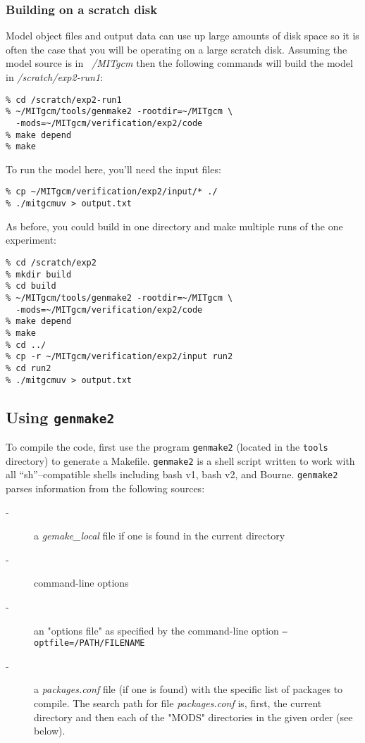 \subsubsection{Building on a scratch disk}

Model object files and output data can use up large amounts of disk
space so it is often the case that you will be operating on a large
scratch disk. Assuming the model source is in {\em ~/MITgcm} then the
following commands will build the model in {\em /scratch/exp2-run1}:
\begin{verbatim}
% cd /scratch/exp2-run1
% ~/MITgcm/tools/genmake2 -rootdir=~/MITgcm \
  -mods=~/MITgcm/verification/exp2/code
% make depend
% make
\end{verbatim}
To run the model here, you'll need the input files:
\begin{verbatim}
% cp ~/MITgcm/verification/exp2/input/* ./
% ./mitgcmuv > output.txt
\end{verbatim}

As before, you could build in one directory and make multiple runs of
the one experiment:
\begin{verbatim}
% cd /scratch/exp2
% mkdir build
% cd build
% ~/MITgcm/tools/genmake2 -rootdir=~/MITgcm \
  -mods=~/MITgcm/verification/exp2/code
% make depend
% make
% cd ../
% cp -r ~/MITgcm/verification/exp2/input run2
% cd run2
% ./mitgcmuv > output.txt
\end{verbatim}


\subsection{Using \texttt{genmake2}}
\label{sect:genmake}

To compile the code, first use the program \texttt{genmake2} (located
in the \texttt{tools} directory) to generate a Makefile.
\texttt{genmake2} is a shell script written to work with all
``sh''--compatible shells including bash v1, bash v2, and Bourne.
\texttt{genmake2} parses information from the following sources:
\begin{description}
\item[-] a {\em gemake\_local} file if one is found in the current 
  directory
\item[-] command-line options
\item[-] an "options file" as specified by the command-line option
  \texttt{--optfile=/PATH/FILENAME}
\item[-] a {\em packages.conf} file (if one is found) with the 
  specific list of packages to compile. The search path for 
  file {\em packages.conf} is, first, the current directory and
  then each of the "MODS" directories in the given order (see below).
\end{description}


